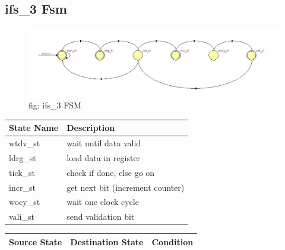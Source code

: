 \documentclass[12pt,a4 paper] {report}
\begin{document}
\subsection{ifs\_3 Fsm}
\begin{figure}[h]
	\centering	
	\includegraphics[scale=0.4]{../png/ifs_3.png}
	\newline
	fig: ifs\_3 FSM\\
\end{figure}
\begin{center}
 \begin{tabular}{| p{4cm} | p{7cm} |}
	 \hline
	 \textbf{State Name} & \textbf{Description} \\
	 \hline
	 wtdv\_st & wait until data valid \\
	 \hline
	 ldrg\_st & load data in register \\
	 \hline
	 tick\_st & check if done, else go on \\
	 \hline
	 incr\_st & get next bit (increment counter) \\
	 \hline
	 wocy\_st & wait one clock cycle \\
	 \hline
	 vali\_st & send validation bit \\
	 \hline
 \end{tabular}
\end{center}
\begin{center}
	\begin{tabular}{| p{2cm} | p{2cm} | p{11cm} |}
		\hline
		Source State& Destination State & Condition \\
		\hline	
		
	\end{tabular}	
\end{center}

\newpage
\end{document}
